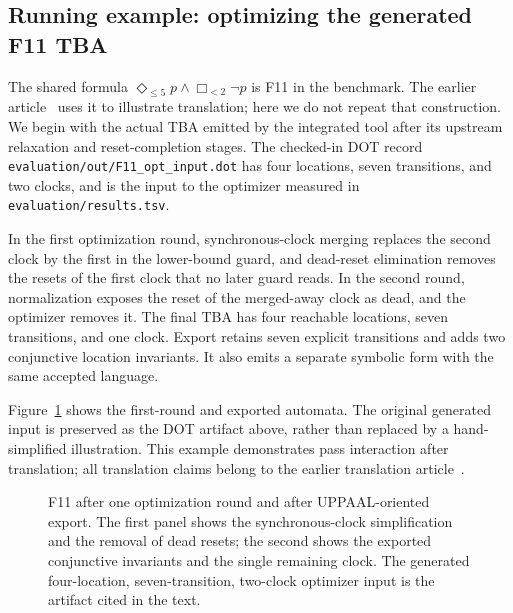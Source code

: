 \subsection{Running example: optimizing the generated F11 TBA}
The shared formula
$\Diamond_{\le5}p\land\Box_{<2}\neg p$ is F11 in the benchmark. The earlier article~\cite{fares_bodeveix_mtl_translation}
uses it to illustrate translation; here we do not repeat that construction.
We begin with the actual TBA emitted by the integrated tool after its
upstream relaxation and reset-completion stages. The checked-in DOT record
\texttt{evaluation/out/F11\_opt\_input.dot} has four locations, seven
transitions, and two clocks, and is the input to the optimizer measured in
\texttt{evaluation/results.tsv}.

In the first optimization round, synchronous-clock merging replaces the second
clock by the first in the lower-bound guard, and dead-reset elimination removes
the resets of the first clock that no later guard reads. In the
second round, normalization exposes the reset of the merged-away clock as dead,
and the optimizer removes it. The final TBA has four reachable locations,
seven transitions, and one clock. Export retains seven explicit transitions
and adds two conjunctive location invariants. It also emits a separate
symbolic form with the same accepted language.

Figure~\ref{fig:running-pipeline} shows the first-round and exported
automata. The original generated input is preserved as the DOT artifact
above, rather than replaced by a hand-simplified illustration. This example
demonstrates pass interaction after translation; all translation claims
belong to the earlier translation article~\cite{fares_bodeveix_mtl_translation}.

\begin{figure}[!t]
\centering
\resizebox{\textwidth}{!}{}
\caption{F11 after one optimization round and after UPPAAL-oriented export.
The first panel shows the synchronous-clock simplification and the removal of
dead resets; the second shows the exported conjunctive invariants and the
single remaining clock. The generated four-location, seven-transition,
two-clock optimizer input is the artifact cited in the text.}
\label{fig:running-pipeline}
\end{figure}
